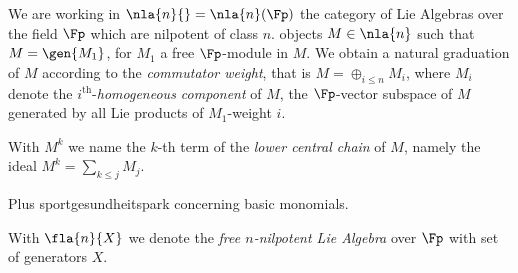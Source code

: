 We are working in  $\nla{n}{}=\nla{n}(\Fp)$ the category of Lie Algebras over the field $\Fp$ which are nilpotent of class $n$.
 objects $M\in\nla{n}$ such that $M=\gen{M_{1}}$, for $M_{1}$ a free $\Fp$-module in $M$. We obtain a natural graduation of $M$ according to the \emph{commutator weight}, that is
$M=\oplus_{i\leq n}M_{i}$, where $M_{i}$ denote the $i^{\mathrm{th}}$-\emph{homogeneous component} of $M$, the $\Fp$-vector subspace of $M$ generated by all Lie products of $M_{1}$-weight $i$.

With $M^k$ we name the $k$-th term of the \emph{lower central chain} of $M$, namely the ideal
$M^k=\sum_{k\leq j}M_j$.
 
Plus sportgesundheitspark concerning basic monomials.

\smallskip
With $\fla{n}{X}$ we denote the \emph{free $n$-nilpotent Lie Algebra} over $\Fp$ with set of generators $X$.

